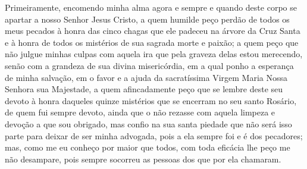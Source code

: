 Primeiramente, encomendo minha alma agora e sempre e quando deste corpo
se apartar a nosso Senhor Jesus Cristo, a quem humilde peço perdão de
todos os meus pecados à honra das cinco chagas que ele padeceu na
árvore da Cruz Santa e à honra de todos os mistérios de sua sagrada
morte e paixão; a quem peço que não julgue minhas culpas com aquela ira
que pela graveza delas estou merecendo, senão com a grandeza de sua
divina misericórdia, em a qual ponho a esperança de minha salvação, em
o favor e a ajuda da sacratíssima Virgem Maria Nossa Senhora sua
Majestade, a quem afincadamente peço que se lembre deste seu devoto à
honra daqueles quinze mistérios que se encerram no seu santo Rosário,
de quem fui sempre devoto, ainda que o não rezasse com aquela limpeza e
devoção a que sou obrigado, mas confio na sua santa piedade que não
será isso parte para deixar de ser minha advogada, pois a ela sempre 
foi e é dos pecadores; mas, como me eu conheço por maior que todos, com
toda eficácia lhe peço me não desampare, pois sempre socorreu as
pessoas dos que por ela chamaram.

